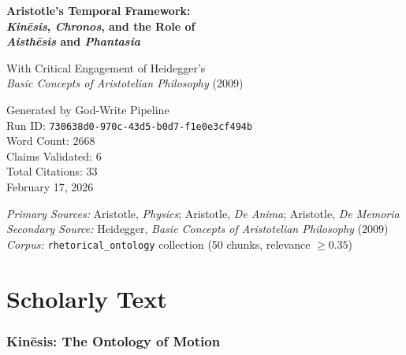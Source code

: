 \documentclass[12pt,a4paper]{article}
\begin{document}

\begin{titlepage}
\centering
\vspace*{2cm}
{\LARGE\bfseries Aristotle's Temporal Framework:\\[0.3em]
\textit{Kin\=esis}, \textit{Chronos}, and the Role of\\[0.3em]
\textit{Aisth\=esis} and \textit{Phantasia}\par}
\vspace{1.5cm}
{\large With Critical Engagement of Heidegger's\\
\textit{Basic Concepts of Aristotelian Philosophy} (2009)\par}
\vspace{2cm}
{\normalsize Generated by God-Write Pipeline\\[0.5em]
Run ID: \texttt{730638d0-970c-43d5-b0d7-f1e0e3cf494b}\\[0.3em]
Word Count: 2668\\[0.3em]
Claims Validated: 6\\[0.3em]
Total Citations: 33\\[0.3em]
February 17, 2026\par}
\vfill
{\small\textit{Primary Sources:} Aristotle, \textit{Physics}; Aristotle, \textit{De Anima}; Aristotle, \textit{De Memoria}\\
\textit{Secondary Source:} Heidegger, \textit{Basic Concepts of Aristotelian Philosophy} (2009)\\[0.5em]
\textit{Corpus:} \texttt{rhetorical\_ontology} collection (50 chunks, relevance $\geq 0.35$)}
\end{titlepage}

\tableofcontents
\newpage


\part{Scholarly Text}

\section{Kin\=esis: The Ontology of Motion}
\end{document}
